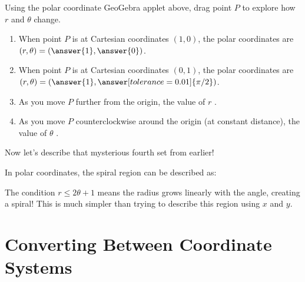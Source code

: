 \documentclass{ximera}
\begin{document}
\begin{problem}
    Using the polar coordinate GeoGebra applet above, drag point $P$ to explore how $r$ and $\theta$ change.
    
    \begin{enumerate}
        \item When point $P$ is at Cartesian coordinates $(1,0)$, the polar coordinates are $(r,\theta) = (\answer{1},\answer{0})$.
        
        \item When point $P$ is at Cartesian coordinates $(0,1)$, the polar coordinates are $(r,\theta) = (\answer{1},\answer[tolerance=0.01]{\pi/2})$.
        
        \item As you move $P$ further from the origin, the value of $r$ .
        
        \item As you move $P$ counterclockwise around the origin (at constant distance), the value of $\theta$ .
    \end{enumerate}
\end{problem}

\begin{problem}
    Now let's describe that mysterious fourth set from earlier!
    
    In polar coordinates, the spiral region can be described as:
    \begin{multipleChoice}
    \end{multipleChoice}
    
    \begin{feedback}
        The condition $r \leq 2\theta + 1$ means the radius grows linearly with the angle, creating a spiral! This is much simpler than trying to describe this region using $x$ and $y$.
    \end{feedback}
\end{problem}

\section*{Converting Between Coordinate Systems}
\end{document}
